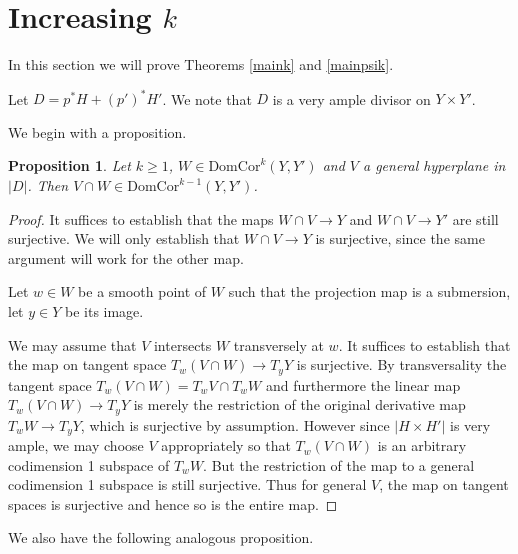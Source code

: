 \documentclass[12pt]{amsart}
\numberwithin{equation}{section}
\newtheorem{proposition}[theorem]{Proposition}
\numberwithin{theorem}{section}
\theoremstyle{definition}
\theoremstyle{definition}
\def \DC{{\mathrm{DomCor}}}
\begin{document}
    \section{Increasing $k$}
In this section we will prove Theorems \ref{maink} and \ref{mainpsik}.

Let $D = p^*H + (p')^* H'$. We note that $D$ is a very ample divisor on $Y \times Y'$. 



We begin with a proposition.

\begin{proposition}
    Let $k \ge 1$, $W \in \DC^k(Y, Y')$ and $V$  a general hyperplane in $|D|$. Then $V \cap W \in \DC^{k-1}(Y, Y')$. 
\end{proposition}
\begin{proof}
    It suffices to establish  that the maps $W \cap V \to Y$ and $W \cap V \to Y'$ are still surjective. We will only establish that $W \cap V \to Y$ is surjective, since the same argument will work for the other map.

    Let $w \in W$ be a smooth point of $W$ such that the projection map is a submersion, let $y \in Y$ be its image.

    We may assume that $V$ intersects $W$ transversely at $w$.   It suffices to establish that the map on tangent space $T_w (V \cap W) \to T_yY$ is surjective. By transversality the tangent space $T_w (V \cap W) = T_w V \cap T_w W$ and furthermore the linear map $T_w (V \cap W) \to T_yY$ is merely the restriction of the original derivative map $T_w W \to T_y Y$, which is surjective by assumption.
     However since $|H \times H'|$ is very ample, we may choose $V$ appropriately so that $T_w (V \cap W)$ is an arbitrary codimension 1 subspace of $T_w W$. But  the restriction of the map to a general codimension 1 subspace is still surjective. Thus for general $V$, the map on tangent spaces is surjective and hence so is the entire map. 

    
\end{proof}
We also have the following analogous proposition.
\end{document}

